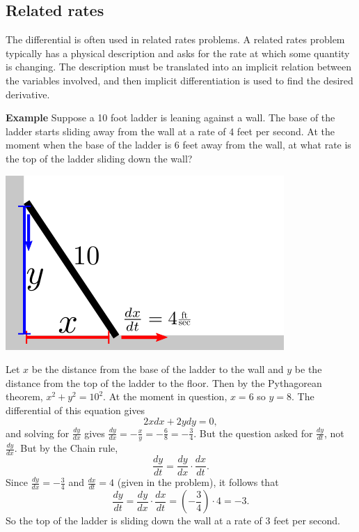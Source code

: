 \documentclass[twoside,openright,titlepage,a4paper]{book}
\begin{document}
\begin{sloppypar}
\subsection{Related rates}			

The differential is often used in related rates problems. A related rates problem typically has a physical description and asks for the rate at which some quantity is changing. The description must be translated into an implicit relation between the variables involved, and then implicit differentiation is used to find the desired derivative.

\textbf{Example} Suppose a 10 foot ladder is leaning against a wall. The base of the ladder starts sliding away from the wall at a rate of 4 feet per second. At the moment when the base of the ladder is 6 feet away from the wall, at what rate is the top of the ladder sliding down the wall?
\begin{examplebox}
\begin{center}\includegraphics[scale=0.6]{Ladder}\end{center}		
Let $x$ be the distance from the base of the ladder to the wall and $y$ be the distance from the top of the ladder to the floor. Then by the Pythagorean theorem, $x^2+y^2 = 10^2$. At the moment in question, $x=6$ so $y=8$.
The differential of this equation gives
\begin{equation*} 2xdx+2ydy = 0, \end{equation*}
and solving for $\frac{dy}{dx}$ gives $\frac{dy}{dx} = -\frac{x}{y} = -\frac{6}{8} = -\frac{3}{4}$. But the question asked for $\frac{dy}{dt}$, not $\frac{dy}{dx}$. But by the Chain rule,
\begin{equation*} \frac{dy}{dt} = \frac{dy}{dx}\cdot \frac{dx}{dt}. \end{equation*}
Since $\frac{dy}{dx} = -\frac{3}{4}$ and $\frac{dx}{dt} = 4$ (given in the problem), it follows that
\begin{equation*} 
\frac{dy}{dt} = \frac{dy}{dx}\cdot \frac{dx}{dt} = \left(-\frac{3}{4}\right) \cdot 4 = -3.
\end{equation*}
So the top of the ladder is sliding down the wall at a rate of 3 feet per second.
\end{examplebox}


\end{sloppypar}
\end{document}
